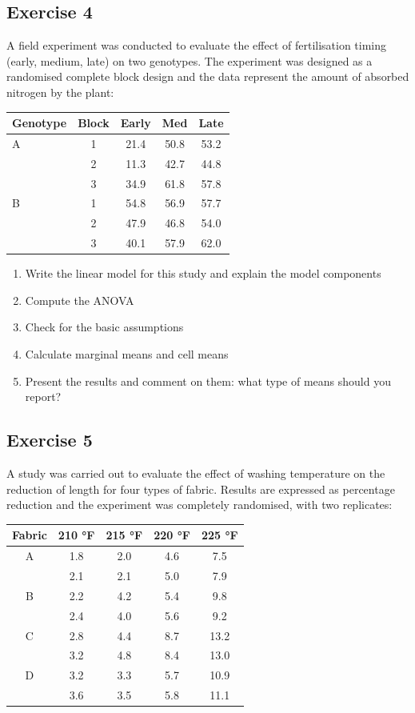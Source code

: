 \documentclass[a4paper,12pt,oneside]{book}
\providecommand{\tightlist}{%
  \setlength{\itemsep}{0pt}\setlength{\parskip}{0pt}}
\begin{document}
\hypertarget{exercise-4-4}{%
\subsection{Exercise 4}\label{exercise-4-4}}

A field experiment was conducted to evaluate the effect of fertilisation timing (early, medium, late) on two genotypes. The experiment was designed as a randomised complete block design and the data represent the amount of absorbed nitrogen by the plant:

\begin{longtable}[]{@{}lcccc@{}}
\toprule
Genotype & Block & Early & Med & Late \\
\midrule
\endhead
A & 1 & 21.4 & 50.8 & 53.2 \\
& 2 & 11.3 & 42.7 & 44.8 \\
& 3 & 34.9 & 61.8 & 57.8 \\
B & 1 & 54.8 & 56.9 & 57.7 \\
& 2 & 47.9 & 46.8 & 54.0 \\
& 3 & 40.1 & 57.9 & 62.0 \\
\bottomrule
\end{longtable}

\begin{enumerate}
\def\labelenumi{\arabic{enumi}.}
\tightlist
\item
  Write the linear model for this study and explain the model components
\item
  Compute the ANOVA
\item
  Check for the basic assumptions
\item
  Calculate marginal means and cell means
\item
  Present the results and comment on them: what type of means should you report?
\end{enumerate}

\hypertarget{exercise-5-2}{%
\subsection{Exercise 5}\label{exercise-5-2}}

A study was carried out to evaluate the effect of washing temperature on the reduction of length for four types of fabric. Results are expressed as percentage reduction and the experiment was completely randomised, with two replicates:

\begin{longtable}[]{@{}ccccc@{}}
\toprule
Fabric & 210 °F & 215 °F & 220 °F & 225 °F \\
\midrule
\endhead
A & 1.8 & 2.0 & 4.6 & 7.5 \\
& 2.1 & 2.1 & 5.0 & 7.9 \\
B & 2.2 & 4.2 & 5.4 & 9.8 \\
& 2.4 & 4.0 & 5.6 & 9.2 \\
C & 2.8 & 4.4 & 8.7 & 13.2 \\
& 3.2 & 4.8 & 8.4 & 13.0 \\
D & 3.2 & 3.3 & 5.7 & 10.9 \\
& 3.6 & 3.5 & 5.8 & 11.1 \\
\bottomrule
\end{longtable}
\end{document}
